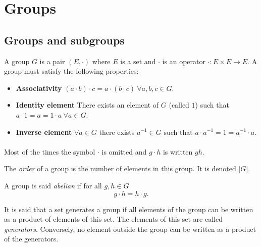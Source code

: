 \section{Groups}

\subsection{Groups and subgroups}

\begin{definition}[Group]
  A group $G$ is a pair $(E, \cdot)$ where $E$ is a set and $\cdot$ is an operator $\cdot: E \times E \to E$. A group must satisfy the following properties:
  \begin{itemize}
    \item \textbf{Associativity} $(a \cdot b) \cdot c = a \cdot (b \cdot c)\ \forall a,b,c \in G$.
    \item \textbf{Identity element} There exists an element of $G$ (called $1$) such that $a \cdot 1 = a = 1 \cdot a \ \forall a \in G$.
    \item \textbf{Inverse element} $\forall a \in G$ there exists $a^{-1} \in G$ such that $a \cdot a^{-1} = 1 = a^{-1} \cdot a$.
  \end{itemize}
\end{definition}

\paragraph{}
Most of the times the symbol $\cdot$ is omitted and $g \cdot h$ is written $gh$.

\begin{definition}[Order]
  The \textit{order} of a group is the number of elements in this group. It is denoted $|G|$.
\end{definition}

\begin{definition}
  A group is said \textit{abelian} if for all $g, h \in G$
  \[
    g \cdot h = h \cdot g.
  \]
\end{definition}

\begin{definition}
  It is said that a set generates a group if all elements of the group can be written as a product of elements of this set. The elements of this set are called \textit{generators}. Conversely, no element outside the group can be written as a product of the generators.
\end{definition}

